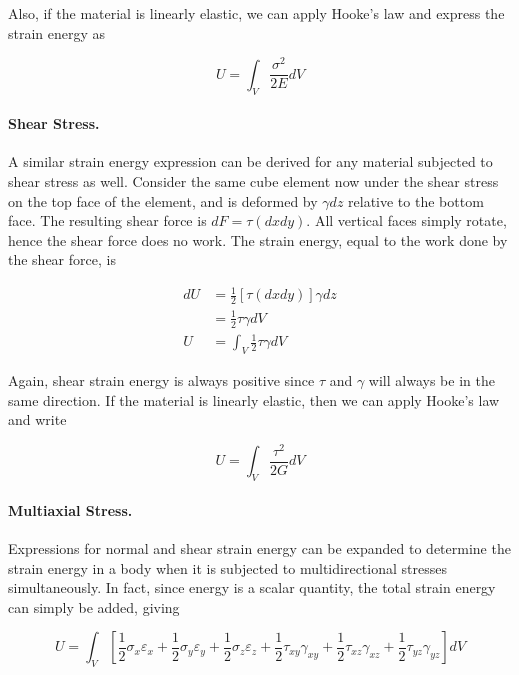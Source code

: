 \documentclass[
10pt,
a4paper,
openany,
svgnames,
]{kaobook} %
\begin{document}
Also, if the material is linearly elastic, we can apply Hooke's law and express the strain energy as

\begin{equation}
  U = \int_V \frac{\sigma^2}{2E} dV
\end{equation}

\paragraph{Shear Stress.}

A similar strain energy expression can be derived for any material subjected to shear stress as well. Consider the same cube element now under the shear stress on the top face of the element, and is deformed by $\gamma dz$ relative to the bottom face. The resulting shear force is $dF = \tau (dx dy)$. All vertical faces simply rotate, hence the shear force does no work. The strain energy, equal to the work done by the shear force, is

\begin{align}
  dU &= \frac{1}{2} \left[ \tau (dx dy) \right] \gamma dz \nonumber \\
     &= \frac{1}{2} \tau \gamma dV \nonumber \\
  U &= \int_V \frac{1}{2} \tau \gamma dV
\end{align}

Again, shear strain energy is always positive since $\tau$ and $\gamma$ will always be in the same direction. If the material is linearly elastic, then we can apply Hooke's law and write

\begin{equation}
  U = \int_V \frac{\tau^2}{2G} dV
\end{equation}

\paragraph{Multiaxial Stress.}

Expressions for normal and shear strain energy can be expanded to determine the strain energy in a body when it is subjected to multidirectional stresses simultaneously. In fact, since energy is a scalar quantity, the total strain energy can simply be added, giving

\begin{equation}
  U = \int_V \left[ \frac{1}{2}\sigma_x \varepsilon_x + \frac{1}{2}\sigma_y \varepsilon_y + \frac{1}{2}\sigma_z \varepsilon_z + \frac{1}{2}\tau_{xy} \gamma_{xy} + \frac{1}{2}\tau_{xz} \gamma_{xz} + \frac{1}{2}\tau_{yz} \gamma_{yz}\right] dV
\end{equation}
\end{document}
